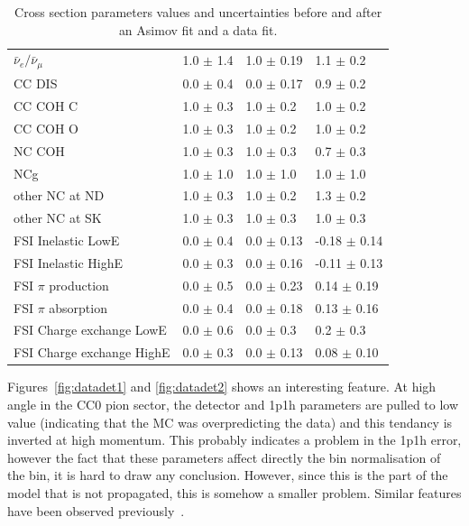\begin{table}[ht]
\begin{tabular}{llll}
    $\bar{\nu}_e/\bar{\nu}_\mu$           & 1.0 $\pm$ 1.4  & 1.0 $\pm$ 0.19  & 1.1 $\pm$ 0.2         \\ 
    \Gls{CC} \Gls{DIS}                   & 0.0 $\pm$ 0.4    & 0.0 $\pm$ 0.17  & 0.9 $\pm$ 0.2       \\ 
    \Gls{CC} \Gls{COH} C                 & 1.0 $\pm$ 0.3    & 1.0 $\pm$ 0.2   & 1.0 $\pm$ 0.2       \\ 
    \Gls{CC} \Gls{COH} O                 & 1.0 $\pm$ 0.3    & 1.0 $\pm$ 0.2   & 1.0 $\pm$ 0.2       \\ 
    \Gls{NC} \Gls{COH}                   & 1.0 $\pm$ 0.3    & 1.0 $\pm$ 0.3   & 0.7 $\pm$ 0.3       \\ 
    \Gls{NCg}                            & 1.0 $\pm$ 1.0    & 1.0 $\pm$ 1.0   & 1.0 $\pm$ 1.0       \\ 
    other \Gls{NC} at \Gls{ND}           & 1.0 $\pm$ 0.3    & 1.0 $\pm$ 0.2   & 1.3 $\pm$ 0.2       \\ 
    other \Gls{NC} at \Gls{SK}           & 1.0 $\pm$ 0.3    & 1.0 $\pm$ 0.3   & 1.0 $\pm$ 0.3       \\
    \Gls{FSI} Inelastic LowE             & 0.0 $\pm$ 0.4    & 0.0 $\pm$ 0.13  & -0.18 $\pm$ 0.14    \\
    \Gls{FSI} Inelastic HighE            & 0.0 $\pm$ 0.3    & 0.0 $\pm$ 0.16  & -0.11 $\pm$ 0.13    \\ 
    \Gls{FSI} $\pi$ production           & 0.0 $\pm$ 0.5    & 0.0 $\pm$ 0.23  & 0.14 $\pm$ 0.19     \\ 
    \Gls{FSI} $\pi$ absorption           & 0.0 $\pm$ 0.4    & 0.0 $\pm$ 0.18  & 0.13 $\pm$ 0.16     \\ 
    \Gls{FSI} Charge exchange LowE       & 0.0 $\pm$ 0.6    & 0.0 $\pm$ 0.3   & 0.2 $\pm$ 0.3       \\ 
    \Gls{FSI} Charge exchange HighE      & 0.0 $\pm$ 0.3    & 0.0 $\pm$ 0.13  & 0.08 $\pm$ 0.10     \\ 
    \bottomrule
  \end{tabular}
  \caption{Cross section parameters values and uncertainties before
    and after an \Gls{Asimov} fit and a data fit.}
  \label{tab:postfitxsec}
\end{table}
\clearpage

Figures~\ref{fig:datadet1} and \ref{fig:datadet2} shows an interesting feature. At high angle
in the \Gls{CC}0 pion sector, the detector and 1p1h parameters are
pulled to low value (indicating that the \Gls{MC} was overpredicting
the data) and this tendancy is inverted at high momentum. This
probably indicates a problem in the 1p1h error, however the fact that
these parameters affect directly the bin normalisation of the bin, it
is hard to draw any conclusion. However, since this is the part of the
model that is not propagated, this is somehow a smaller
problem. Similar features have been observed previously~\cite{TN324}.

